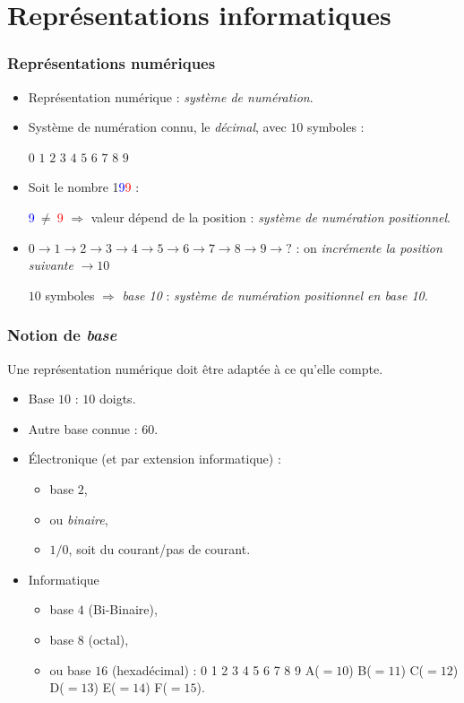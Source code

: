 \section{Repr\'esentations informatiques}

	\frame
	{
		\frametitle{Repr\'esentations num\'eriques}
		\begin{itemize}
			\item Repr\'esentation num\'erique : \emph{syst\`eme de num\'eration}.
			\item Syst\`eme de num\'eration connu, le \emph{d\'ecimal}, avec $10$ symboles :
				
			$0$ $1$ $2$ $3$ $4$ $5$ $6$ $7$ $8$ $9$
			\item Soit le nombre 1\textcolor{blue}{9}\textcolor{red}{9} :
			
			\textcolor{blue}{9}$~\neq~$\textcolor{red}{9}
			$\Rightarrow$ valeur d\'epend de la position : \emph{syst\`eme de num\'eration positionnel}.

			\item $0 \rightarrow 1\rightarrow  2 \rightarrow 3 \rightarrow 4 \rightarrow 5 \rightarrow 6 \rightarrow 7 \rightarrow 8 \rightarrow 9\rightarrow ?$ : on \emph{incr\'emente la position suivante} $\rightarrow 10$
			
			$10$ symboles $\Rightarrow$ \emph{base 10} : \emph{syst\`eme de num\'eration positionnel en base 10}.
		\end{itemize}
	}
	
	\frame
	{
		\frametitle{Notion de \emph{base}}
		
		Une repr\'esentation num\'erique doit \^etre adapt\'ee \`a ce qu'elle compte.
		\begin{itemize}
			\item Base $10$ : $10$ doigts.
			\item Autre base connue :  $60$.
			\item \'Electronique (et par extension informatique) :
			\begin{itemize}
				\item base $2$,
				\item ou \emph{binaire},
				\item $1/0$, soit du courant/pas de courant.
			\end{itemize}
			\item Informatique
			\begin{itemize}
				\item base $4$ (Bi-Binaire),
				\item base $8$ (octal),
				\item ou base $16$ (hexad\'ecimal) : 0 1 2 3 4 5 6 7 8 9 A($=10$) B($=11$) C($=12$) D($=13$) E($=14$) F($=15$).
			\end{itemize}
		\end{itemize}
	}
	
